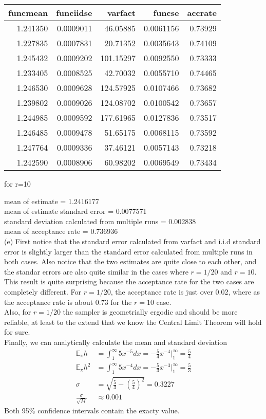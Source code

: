 \begin{center}
\begin{knitrout}
\color{fgcolor}
\begin{tabular}{r|r|r|r|r}
\hline
funcmean & funciidse & varfact & funcse & accrate\\
\hline
1.241350 & 0.0009011 & 46.05885 & 0.0061156 & 0.73929\\
\hline
1.227835 & 0.0007831 & 20.71352 & 0.0035643 & 0.74109\\
\hline
1.245432 & 0.0009202 & 101.15297 & 0.0092550 & 0.73333\\
\hline
1.233405 & 0.0008525 & 42.70032 & 0.0055710 & 0.74465\\
\hline
1.246530 & 0.0009628 & 124.57925 & 0.0107466 & 0.73682\\
\hline
1.239802 & 0.0009026 & 124.08702 & 0.0100542 & 0.73657\\
\hline
1.244985 & 0.0009592 & 177.61965 & 0.0127836 & 0.73517\\
\hline
1.246485 & 0.0009478 & 51.65175 & 0.0068115 & 0.73592\\
\hline
1.247764 & 0.0009336 & 37.46121 & 0.0057143 & 0.73218\\
\hline
1.242590 & 0.0008906 & 60.98202 & 0.0069549 & 0.73434\\
\hline
\end{tabular}


\end{knitrout}
for r=10
\end{center}
mean of estimate = 1.2416177\\
mean of estimate standard error = 0.0077571\\
standard deviation calculated from multiple runs = 0.002838\\
mean of acceptance rate = 0.736936\\
(e) First notice that the standard error calculated from varfact and i.i.d standard error is slightly larger than the standard error calculated from multiple runs in both cases. Also notice that the two estimates are quite close to each other, and the standar errors are also quite similar in the cases where $r=1/20$ and $r=10$. This result is quite surprising because the acceptance rate for the two cases are completely different. For $r=1/20$, the acceptance rate is just over 0.02, where as the acceptance rate is about 0.73 for the $r=10$ case.\\
Also, for $r=1/20$ the sampler is geometrially ergodic and should be more reliable, at least to the extend that we know the Central Limit Theorem will hold for sure.\\
Finally, we can analytically calculate the mean and standard deviation 
\begin{align*}
\mathbb{E}_\pi h &= \int_1^\infty 5x^{-5}dx = -\frac{5}{4}x^{-4}\bigg|^\infty_1 = \frac{5}{4}\\
\mathbb{E}_\pi h^2 &= \int_1^\infty 5x^{-4}dx = -\frac{5}{3}x^{-3}\bigg|^\infty_1 = \frac{5}{3}\\
\sigma &= \sqrt{\frac{5}{3}-\left(\frac{5}{4}\right)^2}=0.3227\\
\frac{\sigma}{\sqrt{M}} &\approx 0.001
\end{align*}
Both 95\% confidence intervals contain the exacty value. 
